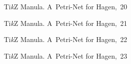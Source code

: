 \documentclass[a4paper,11pt]{article}
\begin{document}
\begin{figure}[ht]

  \centering


  \begin{tikzpicture}



  \end{tikzpicture}

  \caption{Ti\emph{k}Z Manula. A~Petri-Net for Hagen,~20}

\end{figure}





\begin{figure}[ht]

  \centering

  \begin{tikzpicture}



  \end{tikzpicture}

  \caption{Ti\emph{k}Z Manula. A~Petri-Net for Hagen,~21}

\end{figure}





\begin{figure}[ht]

  \centering

  \begin{tikzpicture}



  \end{tikzpicture}

  \caption{Ti\emph{k}Z Manula. A~Petri-Net for Hagen,~22}

\end{figure}





\begin{figure}[ht]

  \centering

  \begin{tikzpicture}



  \end{tikzpicture}

  \caption{Ti\emph{k}Z Manula. A~Petri-Net for Hagen,~23}

\end{figure}
\end{document}
